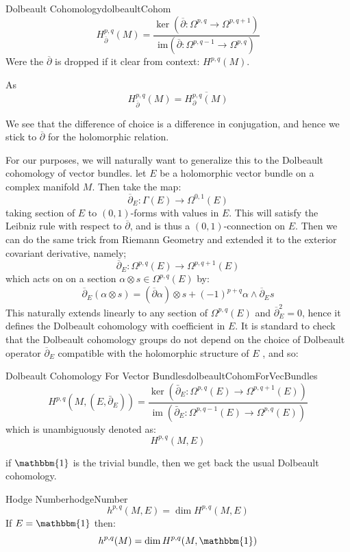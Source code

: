 \documentclass{book}
\newcommand{\im}{{\operatorname{im}}}
\begin{document}
\begin{defn}{Dolbeault Cohomology}{dolbeaultCohom}
  \[
H_{\overline{\partial}}^{p,q}(M) = \frac{\ker(\overline{\partial}: \Omega^{p,q} \to \Omega^{p,q+1})}{\text{im}(\overline{\partial}: \Omega^{p,q-1} \to \Omega^{p,q})}
\]
Were the $\overline{\partial}$ is dropped if it clear from context: $H^{p,q}(M)$.
\end{defn}

As
\[
  H_{\overline{\partial}}^{p,q}(M) = \overline{H_{\partial}^{p,q}(M)}
\]

We see that the difference of choice is a difference in conjugation, and hence we stick to
$\overline{\partial}$ for the holomorphic relation.

For our purposes, we will naturally want to generalize this to the Dolbeault cohomology of vector bundles. let
$E$ be a holomorphic vector bundle on a complex manifold $M$. Then take the map:
\[
  \overline{\partial}_E: \Gamma(E) \to \Omega^{0,1}(E)
\]
taking section of $E$ to $(0,1)$-forms with values in $E$. This will satisfy the Leibniz rule  with respect to
$\overline{\partial}$, and is thus a $(0,1)$-connection on $E$. Then we can do the same trick from Riemann
Geometry and extended it to  the exterior covariant derivative, namely;
\[
  \overline{\partial}_E: \Omega^{p,q}(E) \to \Omega^{p, q+1}(E)
\]
which acts on on a section $\alpha \otimes s \in \Omega^{p,q}(E)$ by:
\[
  \overline{\partial}_E(\alpha\otimes s) = (\overline{\partial}\alpha) \otimes s + (-1)^{p+q}\alpha \wedge
  \overline{\partial}_E s
\]
This naturally extends linearly to any section of $\Omega^{p,q}(E)$ and $\overline{\partial}_E^2 = 0$, hence
it defines the Dolbeault cohomology with coefficient in $E$. It is standard to check that the Dolbeault
cohomology groups do not depend on the choice of Dolbeault operator
$\overline{\partial}_E$ compatible with the holomorphic structure of $E$
\cite{gallierComplexAlgebraicGeometry2011}, and so:
\begin{defn}{Dolbeault Cohomology For Vector Bundles}{dolbeaultCohomForVecBundles}
  \[
H^{p,q}(M,(E,\bar{\partial}_E)) = \frac{\ker(\bar{\partial}_E : \Omega^{p,q}(E) \to \Omega^{p,q+1}(E))}{\im(\bar{\partial}_E : \Omega^{p,q-1}(E) \to \Omega^{p,q}(E))}
\]
which is unambiguously denoted as:
\[
  H^{p,q}(M,E)
\]
\end{defn}
if $\mathbbm{1}$ is the trivial bundle, then we get back the usual Dolbeault cohomology.

\begin{defn}{Hodge Number}{hodgeNumber}
  \[
    h^{p,q}(M,E) = \dim H^{p,q}(M,E)
  \]
  If $E = \mathbbm{1}$ then:
  \[
    h^{p,q}(M) = \dim H^{p,q}(M,\mathbbm{1})
  \]
\end{defn}
\end{document}
